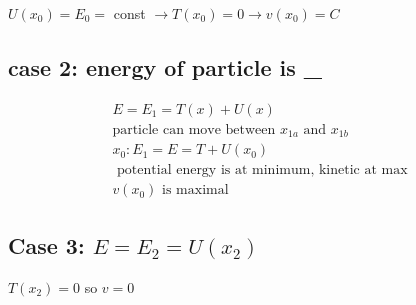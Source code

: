 \documentclass[fleqn]{report}
\newcommand{\equations} [1] {
\begin{gather*}
#1
\end{gather*}
}
\begin{document}
$U(x_0) = E_0 =$ const $\rightarrow T(x_0) = 0 \rightarrow v(x_0) = C$

\subsection{case 2: energy of particle is \_}
\equations{
    E = E_1 = T(x) + U(x)
    \\
    \textrm{particle can move between $x_{1a}$ and $x_{1b}$}
    \\
    x_0: E_1 = E = T + U(x_0) 
    \\
    \textrm{ potential energy is at minimum, kinetic at max}
    \\
    \textrm{$v(x_0)$ is maximal}
}

\subsection{Case 3: $E = E_2 = U(x_2)$}
$T(x_2) = 0$ so $v = 0$
\end{document}
